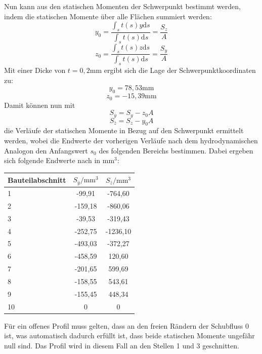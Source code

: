 \noindent Nun kann aus den statischen Momenten der Schwerpunkt bestimmt werden, indem die statischen Momente über alle Flächen summiert werden:
\begin{equation}
	y_{0}=\frac{\int_{s}{}t(s)y\mathrm{d}s}{\int_{s}{}t(s)\mathrm{d}s}=\frac{S_{z}}{A}
\end{equation}
\begin{equation}
	z_{0}=\frac{\int_{s}{}t(s)z\mathrm{d}s}{\int_{s}{}t(s)\mathrm{d}s}=\frac{S_{y}}{A}
\end{equation}
Mit einer Dicke von $t=0,2\mathrm{mm}$ ergibt sich die Lage der Schwerpunktkoordinaten zu:
$$
	y_{0}=78,53\mathrm{mm}
$$
$$
	z_{0}=-15,39\mathrm{mm}
$$
\noindent Damit können nun mit
\begin{equation}
	S_{\bar{y}}=S_y-z_0A
\end{equation} 
\begin{equation}
S_{\bar{z}}=S_z-y_0A
\end{equation} 
die Verläufe der statischen Momente in Bezug auf den Schwerpunkt ermittelt werden, wobei die Endwerte der vorherigen Verläufe nach dem hydrodynamischen Analogon den Anfangswert $s_0$ des folgenden Bereichs bestimmen. Dabei ergeben sich folgende Endwerte nach \cite{TMk} in $\mathrm{mm}^3$:
\begin{center}
\begin{tabular}[h]{l|c|c}
Bauteilabschnitt&$S_{\bar{y}}/\mathrm{mm}^3$&$S_{\bar{z}}/\mathrm{mm}^3$\\
\hline
1&-99,91&-764,60\\
2&-159,18&-860,06\\
3&-39,53&-319,43\\
4&-252,75&-1236,10\\
5&-493,03&-372,27\\
6&-458,59&120,60\\
7&-201,65&599,69\\
8&-158,55&543,61\\
9&-155,45&448,34\\
10&0&0\\
\end{tabular}
\end{center}
Für ein offenes Profil muss gelten, dass an den freien Rändern der Schubfluss $ 0 $ ist, was automatisch dadurch erfüllt ist, dass beide statischen Momente ungefähr null sind. Das Profil wird in diesem Fall an den Stellen 1 und 3 geschnitten.

